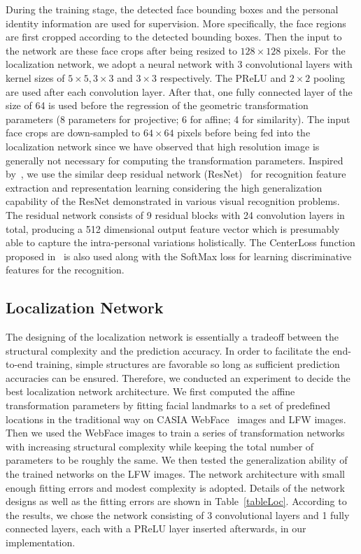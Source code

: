 \documentclass[10pt,twocolumn,letterpaper]{article}
\begin{document}
During the training stage, the detected face bounding boxes and the personal identity information are used for supervision.
More specifically, the face regions are first cropped according to the detected bounding boxes.
Then the input to the network are these face crops after being resized to $128\times 128$ pixels.
For the localization network, we adopt a neural network with 3 convolutional layers with kernel sizes of $5\times5,3\times3$ and $3\times3$ respectively. The PReLU and $2\times2$ pooling are used after each convolution layer.
After that, one fully connected layer of the size of 64 is used before the regression of the geometric transformation parameters (8 parameters for projective; 6 for affine; 4 for similarity).
The input face crops are down-sampled to $64\times64$ pixels before being fed into the localization network since we have observed that high resolution image is generally not necessary for computing the transformation parameters. 
Inspired by~\cite{wen2016discriminative}, we use the similar deep residual network (ResNet)~\cite{he2015deep} for recognition feature extraction and representation learning considering the high generalization capability of the ResNet demonstrated in various visual recognition problems. 
The residual network consists of 9 residual blocks with 24 convolution layers in total, producing a 512 dimensional output feature vector which is presumably able to capture the intra-personal variations holistically. 
The CenterLoss function proposed in~\cite{wen2016discriminative} is also used along with the SoftMax loss for learning discriminative features for the recognition.


\subsection{Localization Network}

The designing of the localization network is essentially a tradeoff between the structural complexity and the prediction accuracy. 
In order to facilitate the end-to-end training, simple structures are favorable so long as sufficient prediction accuracies can be ensured.
Therefore, we conducted an experiment to decide the best localization network architecture.
We first computed the affine transformation parameters by fitting facial landmarks to a set of predefined locations in the traditional way on CASIA WebFace~\cite{yi2014learning} images and LFW images.
Then we used the WebFace images to train a series of transformation networks with increasing structural complexity while keeping the total number of parameters to be roughly the same. 
We then tested the generalization ability of the trained networks on the LFW images.
The network architecture with small enough fitting errors and modest complexity is adopted. 
Details of the network designs as well as the fitting errors are shown in Table~\ref{tableLoc}.%
According to the results, we chose the network consisting of 3 convolutional layers and 1 fully connected layers, each with a PReLU layer inserted afterwards, in our implementation.
\end{document}
